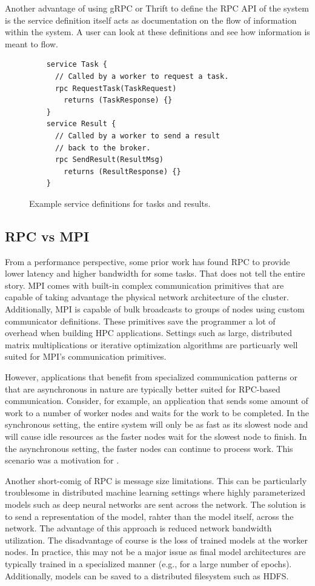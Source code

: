 \documentclass[conference]{IEEEtran}
\begin{document}
Another advantage of using gRPC or Thrift to define the RPC API of the system is
the service definition itself acts as documentation on the flow of information
within the system. A user can look at these definitions and see how information
is meant to flow.

\begin{figure}
  \begin{lstlisting}
    service Task {
      // Called by a worker to request a task.
      rpc RequestTask(TaskRequest)
        returns (TaskResponse) {}
    }
    service Result {
      // Called by a worker to send a result
      // back to the broker.
      rpc SendResult(ResultMsg)
        returns (ResultResponse) {}
    }
  \end{lstlisting}
  \caption{Example service definitions for tasks and results.}
  \label{fig:task-result-services}
\end{figure}

\subsection{RPC vs MPI}
From a performance perspective, some prior work \cite{rpc-perf} has found RPC to
provide lower latency and higher bandwidth for some tasks. That does not tell
the entire story. MPI comes with built-in complex communication primitives that
are capable of taking advantage the physical network architecture of the
cluster. Additionally, MPI is capable of bulk broadcasts to groups of nodes
using custom communicator definitions. These primitives save the programmer a
lot of overhead when building HPC applications. Settings such as large,
distributed matrix multiplications or iterative optimization algorithms are
particuarly well suited for MPI's communication primitives.

However, applications that benefit from specialized communication patterns or
that are asynchronous in nature are typically better suited for RPC-based
communication. Consider, for example, an application that sends some amount of
work to a number of worker nodes and waits for the work to be completed. In the
synchronous setting, the entire system will only be as fast as its slowest node
and will cause idle resources as the faster nodes wait for the slowest node to
finish. In the asynchronous setting, the faster nodes can continue to process
work. This scenario was a motivation for \cite{40565}.

Another short-comig of RPC is message size limitations. This can be particularly
troublesome in distributed machine learning settings where highly parameterized
models such as deep neural networks are sent across the network. The solution
is to send a representation of the model, rahter than the model itself, across
the network. The advantage of this approach is reduced network bandwidth
utilization. The disadvantage of course is the loss of trained models at the
worker nodes. In practice, this may not be a major issue as final model
architectures are typically trained in a specialized manner (e.g., for a large
number of epochs). Additionally, models can be saved to a distributed filesystem
such as HDFS.
\end{document}
